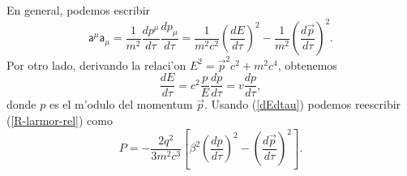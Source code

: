 En general, podemos escribir
\begin{equation}
\mathsf{a}^\mu\mathsf{a}_\mu=\frac{1}{m^2}\frac{dp^\mu}{d\tau}\frac{dp_\mu}{
d\tau}=\frac{1}{m^2c^2}\left( \frac{dE}{d\tau}\right)^2-\frac{1}{m^2}\left(
\frac{d\vec{p}}{d\tau}\right)^2.
\end{equation}
Por otro lado, derivando la relaci'on $E^2=\vec{p}^2c^2+m^2c^4$, obtenemos
\begin{equation}
\frac{dE}{d\tau}=c^2\frac{p}{E}\frac{dp}{d\tau}=v\frac{dp}{d\tau},
\label{dEdtau}
\end{equation}
donde $p$ es el m'odulo del momentum $\vec{p}$. Usando (\ref{dEdtau}) podemos
reescribir (\ref{R-larmor-rel}) como
\begin{equation}
P=-\frac{2q^2}{3m^2c^3}\left[ \beta^2\left(
\frac{dp}{d\tau}\right)^2-\left( \frac{d\vec{p}}{d\tau}\right)^2\right] .
\label{4a2-2}
\end{equation}

